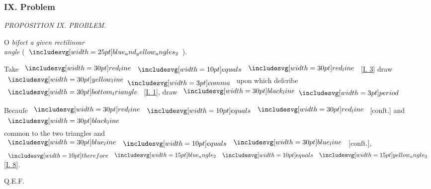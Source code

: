 \documentclass[11pt,preview]{standalone}
\begin{document}
\subsubsection{IX. Problem}

\hfill

\begin{minipage}[t]{0.54\textwidth}
    \begin{center}
        \textit{PROPOSITION IX. PROBLEM.}\label{book1pr9} \\
    \end{center}

    \hfill

    \begin{center}
        \raggedright \lettrine[lines=3, loversize=1, nindent=0pt]{}{}O \textit{biſect a given rectilinear\\ angle} (\hspace{-1ex}$\img{blue_and_yellow_angles_2}$\hspace{-1ex}).
    \end{center}
\end{minipage}%
\hfill
\begin{minipage}[t]{0.43\textwidth}
    \vspace{20pt}
    
\end{minipage}

\hfill

{\vspace{1ex}\begin{center}
        Take $\redline \bequals \redline$ [\hyperref[book1pr3]{\textsc{I.} 3}] draw $\yellowline \bcomma$ upon which deſcribe $\img[0][0][30]{bottom_triangle}$ [\hyperref[book1pr1]{\textsc{I.} 1}], draw $\blackline \bperiod$
    \end{center}}

\hfill

\begin{center}
    Becauſe $\redline \bequals \redline$ [conſt.] and $\blackline$\\
    common to the two triangles and $\blueline \bequals \blueline$ [conſt.],\\
    $\btherefore \img[0][0][15]{blue_angle_2} \bequals \img[0][0][15]{yellow_angle_3}$ [\hyperref[book1pr8]{\textsc{I.} 8}].
\end{center}

\hfill

\hfill Q.E.F.
\end{document}
